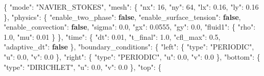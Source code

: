 \documentclass[
  10pt,
]{article}
\newenvironment{Shaded}{}{}
\newcommand{\DataTypeTok}[1]{\textcolor[rgb]{0.56,0.13,0.00}{#1}}
\newcommand{\DecValTok}[1]{\textcolor[rgb]{0.25,0.63,0.44}{#1}}
\newcommand{\FloatTok}[1]{\textcolor[rgb]{0.25,0.63,0.44}{#1}}
\newcommand{\FunctionTok}[1]{\textcolor[rgb]{0.02,0.16,0.49}{#1}}
\newcommand{\KeywordTok}[1]{\textcolor[rgb]{0.00,0.44,0.13}{\textbf{#1}}}
\newcommand{\StringTok}[1]{\textcolor[rgb]{0.25,0.44,0.63}{#1}}
\begin{document}
\begin{Shaded}
\begin{Highlighting}[]
\FunctionTok{\{}
  \DataTypeTok{"mode"}\FunctionTok{:} \StringTok{"NAVIER\_STOKES"}\FunctionTok{,}
  \DataTypeTok{"mesh"}\FunctionTok{:} \FunctionTok{\{}
    \DataTypeTok{"nx"}\FunctionTok{:} \DecValTok{16}\FunctionTok{,}
    \DataTypeTok{"ny"}\FunctionTok{:} \DecValTok{64}\FunctionTok{,}
    \DataTypeTok{"lx"}\FunctionTok{:} \FloatTok{0.16}\FunctionTok{,}
    \DataTypeTok{"ly"}\FunctionTok{:} \FloatTok{0.16}
  \FunctionTok{\},}
  \DataTypeTok{"physics"}\FunctionTok{:} \FunctionTok{\{}
    \DataTypeTok{"enable\_two\_phase"}\FunctionTok{:} \KeywordTok{false}\FunctionTok{,}
    \DataTypeTok{"enable\_surface\_tension"}\FunctionTok{:} \KeywordTok{false}\FunctionTok{,}
    \DataTypeTok{"enable\_convection"}\FunctionTok{:} \KeywordTok{false}\FunctionTok{,}
    \DataTypeTok{"sigma"}\FunctionTok{:} \FloatTok{0.0}\FunctionTok{,}
    \DataTypeTok{"gx"}\FunctionTok{:} \FloatTok{0.0555}\FunctionTok{,}
    \DataTypeTok{"gy"}\FunctionTok{:} \FloatTok{0.0}\FunctionTok{,}
    \DataTypeTok{"fluid1"}\FunctionTok{:} \FunctionTok{\{}
      \DataTypeTok{"rho"}\FunctionTok{:} \FloatTok{1.0}\FunctionTok{,}
      \DataTypeTok{"mu"}\FunctionTok{:} \FloatTok{0.01}
    \FunctionTok{\}}
  \FunctionTok{\},}
  \DataTypeTok{"time"}\FunctionTok{:} \FunctionTok{\{}
    \DataTypeTok{"dt"}\FunctionTok{:} \FloatTok{0.01}\FunctionTok{,}
    \DataTypeTok{"t\_final"}\FunctionTok{:} \FloatTok{1.0}\FunctionTok{,}
    \DataTypeTok{"cfl\_max"}\FunctionTok{:} \FloatTok{0.5}\FunctionTok{,}
    \DataTypeTok{"adaptive\_dt"}\FunctionTok{:} \KeywordTok{false}
  \FunctionTok{\},}
  \DataTypeTok{"boundary\_conditions"}\FunctionTok{:} \FunctionTok{\{}
    \DataTypeTok{"left"}\FunctionTok{:} \FunctionTok{\{}
      \DataTypeTok{"type"}\FunctionTok{:} \StringTok{"PERIODIC"}\FunctionTok{,}
      \DataTypeTok{"u"}\FunctionTok{:} \FloatTok{0.0}\FunctionTok{,}
      \DataTypeTok{"v"}\FunctionTok{:} \FloatTok{0.0}
    \FunctionTok{\},}
    \DataTypeTok{"right"}\FunctionTok{:} \FunctionTok{\{}
      \DataTypeTok{"type"}\FunctionTok{:} \StringTok{"PERIODIC"}\FunctionTok{,}
      \DataTypeTok{"u"}\FunctionTok{:} \FloatTok{0.0}\FunctionTok{,}
      \DataTypeTok{"v"}\FunctionTok{:} \FloatTok{0.0}
    \FunctionTok{\},}
    \DataTypeTok{"bottom"}\FunctionTok{:} \FunctionTok{\{}
      \DataTypeTok{"type"}\FunctionTok{:} \StringTok{"DIRICHLET"}\FunctionTok{,}
      \DataTypeTok{"u"}\FunctionTok{:} \FloatTok{0.0}\FunctionTok{,}
      \DataTypeTok{"v"}\FunctionTok{:} \FloatTok{0.0}
    \FunctionTok{\},}
    \DataTypeTok{"top"}\FunctionTok{:} \FunctionTok{\{}

\end{Highlighting}
\end{Shaded}
\end{document}

